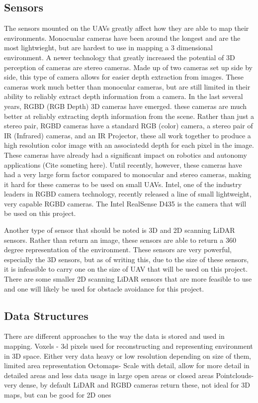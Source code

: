 \documentclass[12pt, letterpaper]{article}
\begin{document}
\subsection{Sensors} 
The sensors mounted on the UAVs greatly affect how they are able to map their environments. Monocualar cameras have been around the longest and are the most lightwieght, but are hardest to use in mapping a 3 dimensional environment. A newer technology that greatly increased the potential of 3D perception of cameras are stereo cameras. Made up of two cameras set up side by side, this type of camera allows for easier depth extraction from images. These cameras work much better than monocular cameras, but are still limited in their ability to reliably extract depth information from a camera. In the last several years, RGBD (RGB Depth) 3D cameras have emerged. these cameras are much better at reliably extracting depth information from the scene. Rather than just a stereo pair, RGBD cameras have a standard RGB (color) camera, a stereo pair of IR (Infrared) cameras, and an IR Projector, these all work together to produce a high resolution color image with an associatedd depth for each pixel in the image. These cameras have already had a significant impact on robotics and autonomy applications (Cite someting here). Until recently, however, these cameras have had a very large form factor compared to monocular and stereo cameras, making it hard for these cameras to be used on small UAVs. Intel, one of the industry leaders in RGBD camera technology, recently released a line of small lightweight, very capable RGBD cameras. The Intel RealSense D435 is the camera that will be used on this project.

Another type of sensor that should be noted is 3D and 2D scanning LiDAR sensors. Rather than return an image, these sensors are able to return a 360 degree representation of the environment. These sensors are very powerful, especially the 3D sensors, but as of writing this, due to the size of these sensors, it is infeasible to carry one on the size of UAV that will be used on this project. There are some smaller 2D scanning LiDAR sensors that are more feasible to use and one will likely be used for obstacle avoidance for this project.
 
\subsection{Data Structures} 
There are different approaches to the way the data is stored and used in mapping. 
Voxels - 3d pixels used for reconstructing and representing environment in 3D space. Either very data heavy or low resolution depending on size of them, limited area representation
Octomaps- Scale with detail, allow for more detail in detailed areas and less data usage in large open areas or closed areas \cite{Hornung2013}
Pointclouds- very dense, by default LiDAR and RGBD cameras return these, not ideal for 3D maps, but can be good for 2D ones
\end{document}

